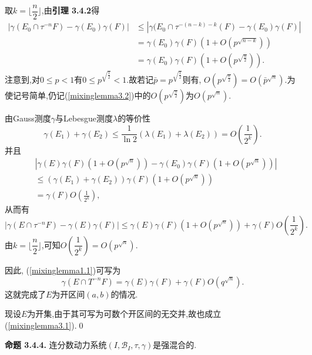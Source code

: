 取$k=\lfloor \dfrac{n}{2}\rfloor$,由\textbf{引理 3.4.2}得
\begin{equation}\label{mixinglemma3.2}
\begin{aligned}
\left|\gamma(E_0\cap \tau^{-n}F)-\gamma(E_0)\gamma(F)\right|&\leqslant\left|\gamma(E_0\cap \tau^{-(n-k)-k}(F)-\gamma(E_0)\gamma(F)\right|\\
&=\gamma(E_0)\gamma(F)(1+O(p^{\sqrt{n-k}}))\\
&=\gamma(E_0)\gamma(F)(1+O(p^{\sqrt{\frac{n}{2}}})).
\end{aligned}
\end{equation}
注意到,对$0\leqslant p<1$有$0\leqslant p^{\sqrt{\frac{1}{2}}}<1$.故若记$\bar{p}=p^{\sqrt{\frac{1}{2}}}$则有, $O(p^{\sqrt{\frac{n}{2}}})=O(\bar{p}^{\sqrt{n}})$.为使记号简单,仍记(\ref{mixinglemma3.2})中的$O(p^{\sqrt{\frac{n}{2}}})$为$O(p^{\sqrt{n}})$.\par
由Gauss测度$\gamma$与Lebesgue测度$\lambda$的等价性$$\gamma(E_1)+\gamma(E_2)\leqslant\frac{1}{\ln2}(\lambda(E_1)+\lambda(E_2))=O(\frac{1}{2^{k}}).$$
并且
\begin{align*}
&\left|\gamma(E)\gamma(F)(1+O(p^{\sqrt{n}}))-\gamma(E_0)\gamma(F)(1+O(p^{\sqrt{n}}))\right|\\
&\leqslant(\gamma(E_1)+\gamma(E_2))\gamma(F)(1+O(p^{\sqrt{n}}))\\
&=\gamma(F)O(\frac{1}{2^{k}}),
\end{align*}
从而有
$$\left|\gamma(E\cap \tau^{-n}F)-\gamma(E)\gamma(F)\right|\leqslant\gamma(E)\gamma(F)(1+O(p^{\sqrt{n}}))+\gamma(F)O(\frac{1}{2^{k}}).$$
由$k=\lfloor \dfrac{n}{2}\rfloor$,可知$O(\dfrac{1}{2^{k}})=O(p^{\sqrt{n}})$.\par
因此, (\ref{mixinglemma1.1})可写为
$$\gamma(E\cap T^{-n}F)=\gamma(E)\gamma(F)+\gamma(F)O(q^{\sqrt{n}}).$$
这就完成了$E$为开区间$(a,b)$的情况.\par
现设$E$为开集,由于其可写为可数个开区间的无交并,故也成立(\ref{mixinglemma3.1}).\qed
\par
\textbf{命题 3.4.4.}\textsuperscript{\cite{Liu_Peng,Mixing_lemma}}
连分数动力系统$(I,\mathcal{B}_I,\tau,\gamma)$是强混合的.
\par

